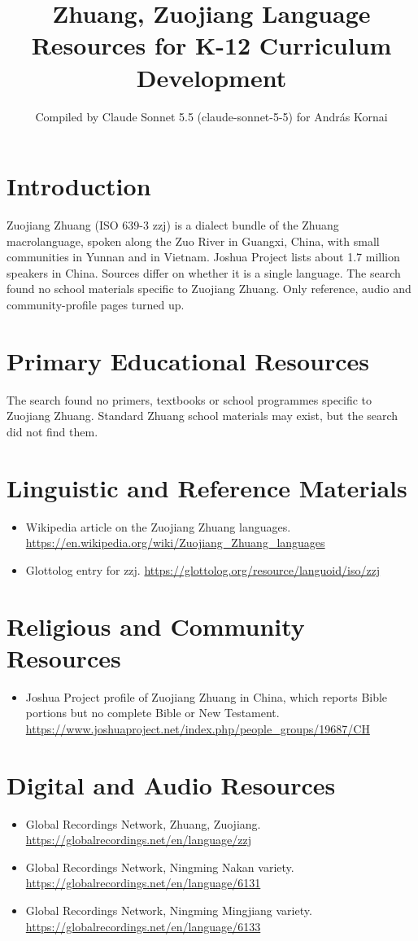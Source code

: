\documentclass[12pt]{article}
\title{Zhuang, Zuojiang Language Resources for K-12 Curriculum Development}
\author{Compiled by Claude Sonnet 5.5 (claude-sonnet-5-5) for Andr\'as Kornai}
\date{}
\begin{document}
\maketitle

\section{Introduction}
Zuojiang Zhuang (ISO 639-3 zzj) is a dialect bundle of the Zhuang macrolanguage, spoken along the Zuo River in Guangxi, China, with small communities in Yunnan and in Vietnam. Joshua Project lists about 1.7 million speakers in China. Sources differ on whether it is a single language. The search found no school materials specific to Zuojiang Zhuang. Only reference, audio and community-profile pages turned up.

\section{Primary Educational Resources}
The search found no primers, textbooks or school programmes specific to Zuojiang Zhuang. Standard Zhuang school materials may exist, but the search did not find them.

\section{Linguistic and Reference Materials}
\begin{itemize}
\item Wikipedia article on the Zuojiang Zhuang languages. \url{https://en.wikipedia.org/wiki/Zuojiang_Zhuang_languages}
\item Glottolog entry for zzj. \url{https://glottolog.org/resource/languoid/iso/zzj}
\end{itemize}

\section{Religious and Community Resources}
\begin{itemize}
\item Joshua Project profile of Zuojiang Zhuang in China, which reports Bible portions but no complete Bible or New Testament. \url{https://www.joshuaproject.net/index.php/people_groups/19687/CH}
\end{itemize}

\section{Digital and Audio Resources}
\begin{itemize}
\item Global Recordings Network, Zhuang, Zuojiang. \url{https://globalrecordings.net/en/language/zzj}
\item Global Recordings Network, Ningming Nakan variety. \url{https://globalrecordings.net/en/language/6131}
\item Global Recordings Network, Ningming Mingjiang variety. \url{https://globalrecordings.net/en/language/6133}
\end{itemize}
\end{document}
